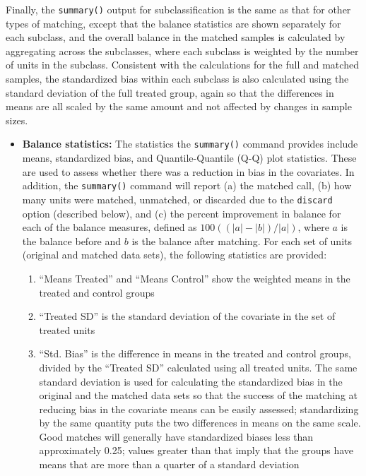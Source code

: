 Finally, the \texttt{summary()} output for subclassification is the
same as that for other types of matching, except that the balance
statistics are shown separately for each subclass, and the overall
balance in the matched samples is calculated by aggregating across the
subclasses, where each subclass is weighted by the number of units in
the subclass.  Consistent with the calculations for the full and
matched samples, the standardized bias within each subclass is also
calculated using the standard deviation of the full treated group,
again so that the differences in means are all scaled by the same
amount and not affected by changes in sample sizes.


\begin{itemize}
\item {\bf Balance statistics:} The statistics the \texttt{summary()}
  command provides include means, standardized bias, and
  Quantile-Quantile (Q-Q) plot statistics.  These are used to assess
  whether there was a reduction in bias in the covariates. In
  addition, the \texttt{summary()} command will report (a) the matched
  call, (b) how many units were matched, unmatched, or discarded due
  to the \texttt{discard} option (described below), and (c) the
  percent improvement in balance for each of the balance measures,
  defined as $100((|a|-|b|)/|a|)$, where $a$ is the balance before and
  $b$ is the balance after matching.  For each set of units (original
  and matched data sets), the following statistics are provided:
\begin{enumerate}
  \item ``Means Treated'' and ``Means Control'' show the weighted
    means in the treated and control groups
  \item ``Treated SD'' is the standard deviation of the covariate in
    the set of treated units
  \item ``Std. Bias'' is the difference in means in the treated and
    control groups, divided by the ``Treated SD'' calculated using all
    treated units.  The same standard deviation is used for
    calculating the standardized bias in the original and the matched
    data sets so that the success of the matching at reducing bias in
    the covariate means can be easily assessed; standardizing by the
    same quantity puts the two differences in means on the same scale.
    Good matches will generally have standardized biases less than
    approximately 0.25; values greater than that imply that the groups
    have means that are more than a quarter of a standard deviation

\end{enumerate}
\end{itemize}
